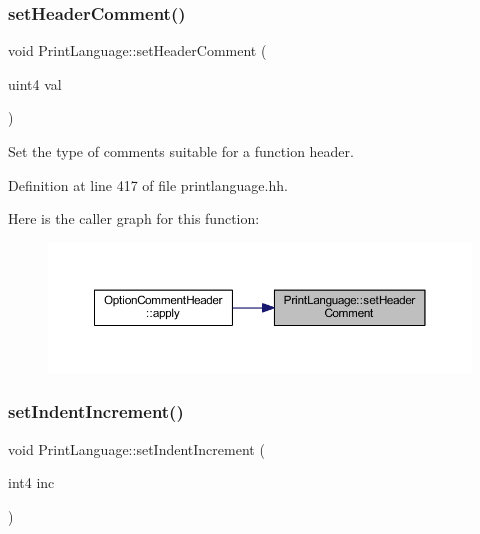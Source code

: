\subsubsection{\texorpdfstring{setHeaderComment()}{setHeaderComment()}}
{\footnotesize\ttfamily void Print\+Language\+::set\+Header\+Comment (\begin{DoxyParamCaption}\item[{uint4}]{val }\end{DoxyParamCaption})\hspace{0.3cm}{\ttfamily [inline]}}



Set the type of comments suitable for a function header. 



Definition at line 417 of file printlanguage.\+hh.

Here is the caller graph for this function\+:
\nopagebreak
\begin{figure}[H]
\begin{center}
\leavevmode
\includegraphics[width=350pt]{class_print_language_a13a95cf52caabc9800a69e0a2bf90332_icgraph}
\end{center}
\end{figure}
\mbox{\label{class_print_language_aeb4cf2e83c51955a1f03b38c322838cc}} 
\subsubsection{\texorpdfstring{setIndentIncrement()}{setIndentIncrement()}}
{\footnotesize\ttfamily void Print\+Language\+::set\+Indent\+Increment (\begin{DoxyParamCaption}\item[{int4}]{inc }\end{DoxyParamCaption})\hspace{0.3cm}{\ttfamily [inline]}}



